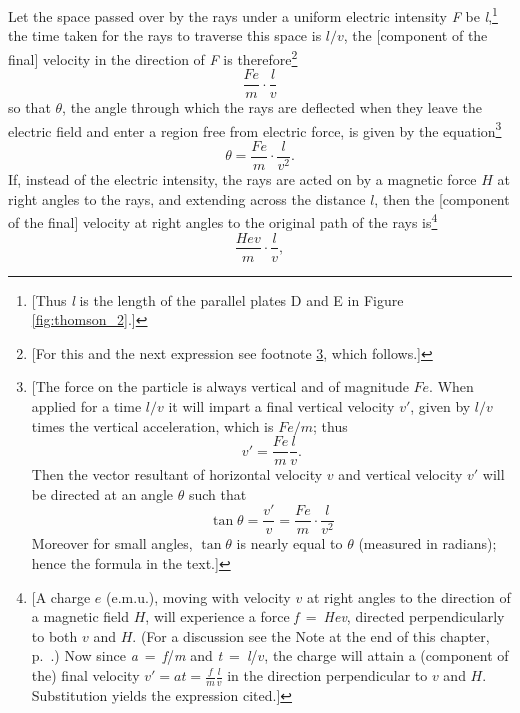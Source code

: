 Let the space passed over by the rays under a uniform electric intensity
\emph{F} be \emph{l},\footnote{{[}Thus \emph{l} is the length of the
  parallel plates D and E in Figure \ref{fig:thomson_2}.{]}} the time taken for the rays
to traverse this space is $l/v$, the {[}component of the final{]}
velocity in the direction of \emph{F} is therefore\footnote{{[}For this and the next expression 
see footnote \ref{fn:thomson_6}, which follows.{]}}
%
\begin{equation*}
\frac{Fe}{m} \cdot \frac{l}{v} 
\end{equation*}
%
so that $\theta$, the angle through which the rays are deflected when
they leave the electric field and enter a region free from electric
force, is given by the equation\footnote{\label{fn:thomson_6}{[}The force on the particle is always vertical and of
  magnitude $Fe$. When applied for a time $l/v$ it will impart
  a final vertical velocity $v'$, given by $l/v$ times the
  vertical acceleration, which is $Fe/m$; thus
\begin{equation*}
v' = \frac{Fe}{m} \frac{l}{v}.
\end{equation*}
  Then the vector resultant of horizontal velocity $v$ and vertical
  velocity $v'$ will be directed at an angle $\theta$ such that
\begin{equation*}
\tan{\theta} = \frac{v'}{v} = \frac{Fe}{m} \cdot \frac{l}{v^2}
\end{equation*}
  Moreover for small angles, $\tan{\theta}$ is nearly equal to
  $\theta$ (measured in radians); hence the formula in the text.{]}}
%
\begin{equation*}
\theta = \frac{Fe}{m} \cdot \frac{l}{v^2}.
\end{equation*}
%
If, instead of the electric intensity, the rays are acted on by a
magnetic force $H$ at right angles to the rays, and extending
across the distance $l$, then the {[}component of the final{]}
velocity at right angles to the original path of the rays is\footnote{{[}A charge $e$ (e.m.u.), moving with velocity $v$
  at right angles to the direction of a magnetic field $H$, will
  experience a force \emph{f}~=~\emph{Hev}, directed per\-pen\-dic\-u\-larly to
  both $v$ and $H$. (For a discussion see the Note at the end of this chapter, p.~\pageref{n:thomson}.) Now since \emph{a}~=~\emph{f}/\emph{m} and
  \emph{t}~=~\emph{l}/$v$, the charge will attain a (component of
  the) final velocity $v' = at = \frac{f}{m} \frac{l}{v}$ in the direction per\-pen\-dic\-u\-lar to $v$ and
  $H$. Substitution yields the expression cited.{]}}
%
\begin{equation*}
\frac{Hev}{m} \cdot \frac{l}{v},
\end{equation*}
